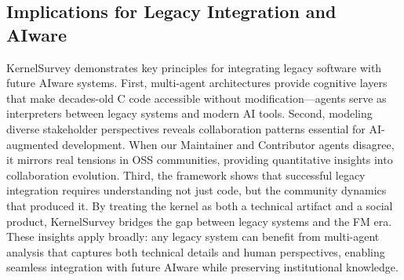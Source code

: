 \subsection{Implications for Legacy Integration and AIware}

KernelSurvey demonstrates key principles for integrating legacy software with future AIware systems. First, multi-agent architectures provide cognitive layers that make decades-old C code accessible without modification—agents serve as interpreters between legacy systems and modern AI tools. Second, modeling diverse stakeholder perspectives reveals collaboration patterns essential for AI-augmented development. When our Maintainer and Contributor agents disagree, it mirrors real tensions in OSS communities, providing quantitative insights into collaboration evolution. Third, the framework shows that successful legacy integration requires understanding not just code, but the community dynamics that produced it. By treating the kernel as both a technical artifact and a social product, KernelSurvey bridges the gap between legacy systems and the FM era. These insights apply broadly: any legacy system can benefit from multi-agent analysis that captures both technical details and human perspectives, enabling seamless integration with future AIware while preserving institutional knowledge.
